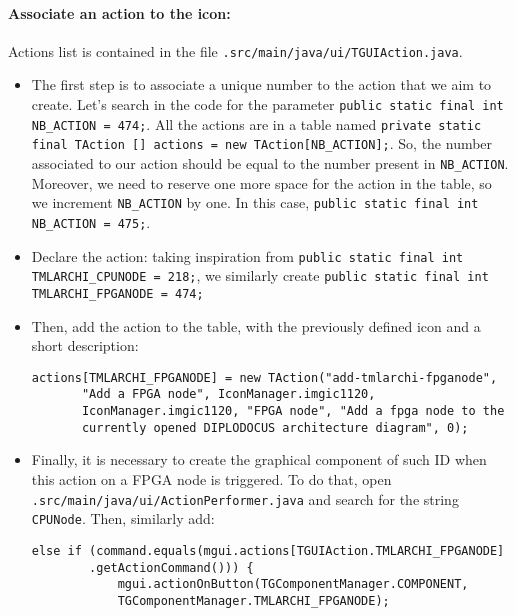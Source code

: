 \documentclass[12pt]{article}
\begin{document}
\paragraph{Associate an action to the icon: } Actions list is contained in the file \texttt{.src/main/java/ui/TGUIAction.java}.
\begin{itemize}
\item The first step is to associate a unique number to the action that we aim to create. Let's search in the code for the parameter \texttt{public static final int NB\_ACTION = 474;}. All the actions are in a table named \texttt{private static final TAction [] actions = new TAction[NB\_ACTION];}. So, the number associated to our action should be equal to the number present in \texttt{NB\_ACTION}. Moreover, we need to reserve one more space for the action in the table, so we increment \texttt{NB\_ACTION} by one. In this case, \texttt{public static final int NB\_ACTION = 475;}.

\item Declare the action: taking inspiration from \texttt{public static final int TMLARCHI\_CPUNODE = 218;}, we similarly  create \texttt{public static final int TMLARCHI\_FPGANODE = 474;}

\item Then, add the action to the table, with the previously defined icon and a short description: 

\begin{lstlisting}
actions[TMLARCHI_FPGANODE] = new TAction("add-tmlarchi-fpganode", 
       "Add a FPGA node", IconManager.imgic1120, 
       IconManager.imgic1120, "FPGA node", "Add a fpga node to the 
       currently opened DIPLODOCUS architecture diagram", 0);
\end{lstlisting}

\item Finally, it is necessary to create the graphical component of such ID when this action on a FPGA node is triggered. To do that, open \texttt{.src/main/java/ui/ActionPerformer.java} and search for the string \texttt{CPUNode}. Then, similarly add:
 \begin{lstlisting}
else if (command.equals(mgui.actions[TGUIAction.TMLARCHI_FPGANODE]
		.getActionCommand())) {
            mgui.actionOnButton(TGComponentManager.COMPONENT, 
            TGComponentManager.TMLARCHI_FPGANODE);
\end{lstlisting}

\end{itemize}
\end{document}
